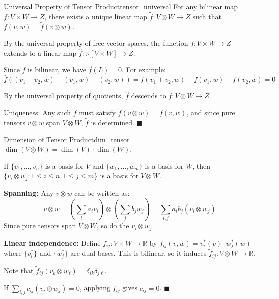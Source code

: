 \documentclass[11pt, letterpaper, openany]{book}
\renewenvironment{proof}[1][\proofname]{%
  \tcolorbox[blanker, breakable, left=1em,
    before skip=1em, after skip=1em,
    borderline west={2pt}{0pt}{MagicTeal!50},
    colback=MagicCream,
    before upper={\textcolor{MagicTeal}{\sffamily\bfseries #1.}\space}
  ]%
}{%
  \hfill\textcolor{MagicTeal}{\ensuremath{\blacksquare}}\endtcolorbox%
}
\begin{document}
\begin{thm}{Universal Property of Tensor Product}{tensor_universal}
For any bilinear map $f: V \times W \to Z$, there exists a unique linear map $\tilde{f}: V \otimes W \to Z$ such that $f(v, w) = \tilde{f}(v \otimes w)$.

\begin{center}
\end{center}
\end{thm}

\begin{proof}
By the universal property of free vector spaces, the function $f: V \times W \to Z$ extends to a linear map $\hat{f}: \mathbb{R}[V \times W] \to Z$.

Since $f$ is bilinear, we have $\hat{f}(L) = 0$. For example:
\[\hat{f}((v_1 + v_2, w) - (v_1, w) - (v_2, w)) = f(v_1 + v_2, w) - f(v_1, w) - f(v_2, w) = 0\]

By the universal property of quotients, $\hat{f}$ descends to $\tilde{f}: V \otimes W \to Z$.

Uniqueness: Any such $\tilde{f}$ must satisfy $\tilde{f}(v \otimes w) = f(v, w)$, and since pure tensors $v \otimes w$ span $V \otimes W$, $\tilde{f}$ is determined.
\end{proof}

\begin{thm}{Dimension of Tensor Product}{dim_tensor}
$\dim(V \otimes W) = \dim(V) \cdot \dim(W)$.

If $\{v_1, \ldots, v_n\}$ is a basis for $V$ and $\{w_1, \ldots, w_m\}$ is a basis for $W$, then $\{v_i \otimes w_j : 1 \leq i \leq n, 1 \leq j \leq m\}$ is a basis for $V \otimes W$.
\end{thm}

\begin{proof}
\textbf{Spanning:} Any $v \otimes w$ can be written as:
\[v \otimes w = \left(\sum_i a_i v_i\right) \otimes \left(\sum_j b_j w_j\right) = \sum_{i,j} a_i b_j (v_i \otimes w_j)\]
Since pure tensors span $V \otimes W$, so do the $v_i \otimes w_j$.

\textbf{Linear independence:} Define $f_{ij}: V \times W \to \mathbb{R}$ by $f_{ij}(v, w) = v_i^*(v) \cdot w_j^*(w)$ where $\{v_i^*\}$ and $\{w_j^*\}$ are dual bases. This is bilinear, so it induces $\tilde{f}_{ij}: V \otimes W \to \mathbb{R}$.

Note that $\tilde{f}_{ij}(v_k \otimes w_\ell) = \delta_{ik} \delta_{j\ell}$.

If $\sum_{i,j} c_{ij}(v_i \otimes w_j) = 0$, applying $\tilde{f}_{ij}$ gives $c_{ij} = 0$.
\end{proof}
\end{document}
